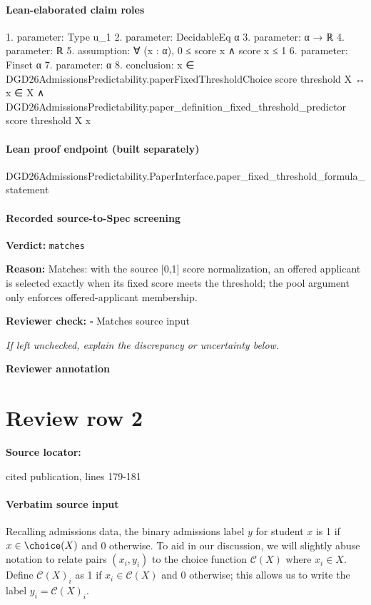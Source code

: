 \documentclass[10pt]{article}
\newcommand{\reviewerbox}{%
  \par\noindent\fbox{\parbox{0.96\linewidth}{\rule{0pt}{0.38in}}}\par
}
\newcommand{\reviewmatch}[1]{%
  \par\noindent\textbf{Reviewer check:} $\square$\; #1\par
  \noindent\emph{If left unchecked, explain the discrepancy or uncertainty below.}\par
}
\begin{document}
\paragraph{Lean-elaborated claim roles}\begin{ReviewVerbatim}
1. parameter: Type u_1
2. parameter: DecidableEq α
3. parameter: α → ℝ
4. parameter: ℝ
5. assumption: ∀ (x : α), 0 ≤ score x ∧ score x ≤ 1
6. parameter: Finset α
7. parameter: α
8. conclusion: x ∈ DGD26AdmissionsPredictability.paperFixedThresholdChoice score threshold X ↔
  x ∈ X ∧ DGD26AdmissionsPredictability.paper_definition_fixed_threshold_predictor score threshold X x
\end{ReviewVerbatim}

\paragraph{Lean proof endpoint (built separately)}\begin{ReviewVerbatim}
DGD26AdmissionsPredictability.PaperInterface.paper_fixed_threshold_formula_statement
\end{ReviewVerbatim}

\paragraph{Recorded source-to-Spec screening}
\textbf{Verdict:} \texttt{matches}
\\
{\raggedright
\textbf{Reason:} Matches:\allowbreak{} with the source [0,1] score normalization, an offered applicant is selected exactly when its fixed score meets the threshold;\allowbreak{} the pool argument only enforces offered-\allowbreak{}applicant membership.\allowbreak{}
\par}
\reviewmatch{Matches source input}
\noindent\textbf{Reviewer annotation}\par
\reviewerbox
\clearpage
\hypertarget{source-claim-d396bf72ee1812a2}{}
\section*{Review row 2}
\textbf{Source locator:} {\footnotesize\raggedright cited publication, lines 179-\allowbreak{}181\par}
\paragraph{Verbatim source input}
\begin{ReviewVerbatim}
Recalling admissions data, the binary admissions label $y$ for student $x$ is 1 if $x \in \choice(X)$ and 0 otherwise.
To aid in our discussion, we will slightly abuse notation to relate pairs $(x_i,y_i)$ to the choice function $\mathcal C(X)$ where $x_i\in X$.
Define $\mathcal C(X)_i$ as 1 if $x_i\in \mathcal C(X)$ and 0 otherwise; this allows us to write the label $y_i=\mathcal C(X)_i$.
\end{ReviewVerbatim}
\end{document}
